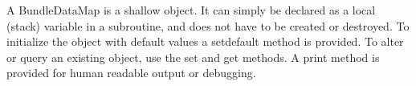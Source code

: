 

A BundleDataMap is a shallow object.  It can simply be declared 
as a local (stack) variable in a subroutine, and does not have
to be created or destroyed.  To initialize the object with default
values a setdefault method is provided.  To alter or query an existing
object, use the set and get methods.  A print method is provided
for human readable output or debugging.


